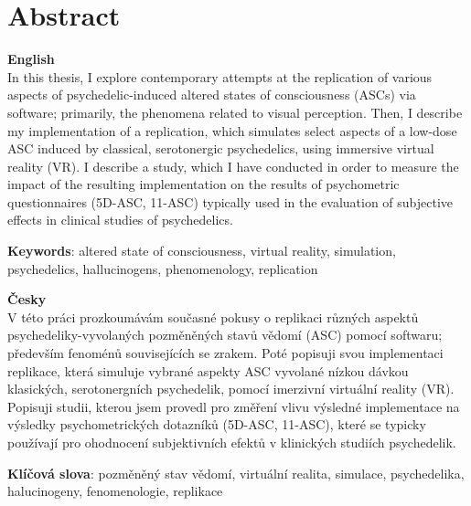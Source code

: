 \chapter*{Abstract}

{\Large\textbf{English}}\\
In this thesis, I explore contemporary attempts at the replication of various aspects of psychedelic-induced altered states of consciousness (ASCs) via software; primarily, the phenomena related to visual perception. Then, I describe my implementation of a replication, which simulates select aspects of a low-dose ASC induced by classical, serotonergic psychedelics, using immersive virtual reality (VR). I describe a study, which I have conducted in order to measure the impact of the resulting implementation on the results of psychometric questionnaires (5D-ASC, 11-ASC) typically used in the evaluation of subjective effects in clinical studies of psychedelics.

\textbf{Keywords}: altered state of consciousness, virtual reality, simulation, psychedelics, hallucinogens, phenomenology, replication

\vspace{0.5cm}
\noindent
{\Large\textbf{Česky}}\\
V této práci prozkoumávám současné pokusy o replikaci různých aspektů psychedeliky-vyvolaných pozměněných stavů vědomí (ASC) pomocí softwaru; především fenoménů souvisejících se zrakem. Poté popisuji svou implementaci replikace, která simuluje vybrané aspekty ASC vyvolané nízkou dávkou klasických, serotonergních psychedelik, pomocí imerzivní virtuální reality (VR). Popisuji studii, kterou jsem provedl pro změření vlivu výsledné implementace na výsledky psychometrických dotazníků (5D-ASC, 11-ASC), které se typicky používají pro ohodnocení subjektivních efektů v klinických studiích psychedelik.

\textbf{Klíčová slova}: pozměněný stav vědomí, virtuální realita, simulace, psychedelika, halucinogeny, fenomenologie, replikace
